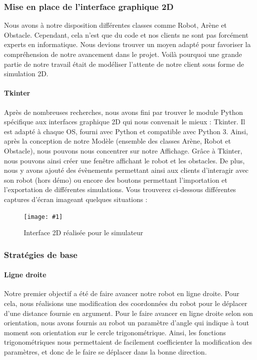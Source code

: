 \documentclass[12pt]{article}
\newcommand\img[2]{
\begin{figure}[!h]
  \centering
    \texttt{[image: \#1]}
  \caption{#2}
  \label{img:#1}
\end{figure}
}
\begin{document}
\subsubsection{Mise en place de l'interface graphique 2D}
Nous avons à notre disposition différentes classes comme Robot, Arène et Obstacle. Cependant,  cela n’est que du code et nos clients ne sont pas forcément experts en informatique. Nous devions trouver un moyen adapté pour favoriser la compréhension de notre avancement dans le projet. Voilà pourquoi une grande partie de notre travail était de modéliser l’attente de notre client sous forme de simulation 2D.

\paragraph{Tkinter\\}
Après de nombreuses recherches, nous avons fini par trouver le module Python spécifique aux interfaces graphique 2D qui nous convenait le mieux : Tkinter. Il est adapté à chaque OS, fourni avec Python et compatible avec Python 3. Ainsi, après la conception de notre Modèle (ensemble des classes Arène, Robot et Obstacle), nous pouvons nous concentrer sur notre Affichage.
Grâce à Tkinter, nous pouvons ainsi créer une fenêtre affichant le robot et les obstacles. De plus, nous y avons ajouté des évènements permettant ainsi aux clients d’interagir avec son robot (hors démo) ou encore des boutons permettant l’importation et l’exportation de différentes simulations.
Vous trouverez ci-dessous différentes captures d’écran imageant quelques situations :

\img{Images/interface2D.png}{Interface 2D réalisée pour le simulateur}

\subsubsection{Stratégies de base}
\paragraph{Ligne droite\\}
Notre premier objectif a été de faire avancer notre robot en ligne droite. Pour cela, nous réalisions une modification des coordonnées du robot pour le déplacer d'une distance fournie en argument. Pour le faire avancer en ligne droite selon son orientation, nous avons fournis au robot un paramètre d'angle qui indique à tout moment son orientation sur le cercle trigonométrique. Ainsi, les fonctions trigonométriques nous permettaient de facilement coefficienter la modification des paramètres, et donc de le faire se déplacer dans la bonne direction.
\end{document}
